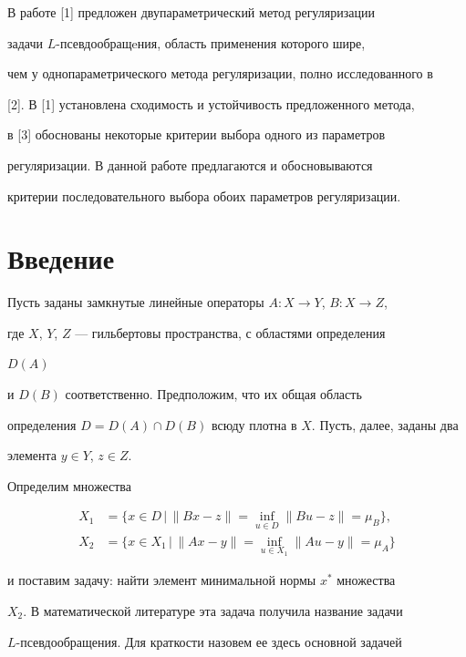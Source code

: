  


В работе [1] предложен двупараметрический метод регуляризации  


задачи $L$-псев\-до\-об\-ра\-щe\-ния, область применения которого шире, 


чем у однопараметрического метода регуляризации, полно исследованного в 


[2]. В [1] установлена сходимость и устойчивость предложенного метода, 


в [3] обоснованы некоторые критерии выбора одного из параметров  


регуляризации. В данной работе предлагаются и обосновываются  


критерии последовательного выбора обоих параметров регуляризации. 


 


\section{Введение} 


 


Пусть заданы замкнутые линейные операторы $A:X\to Y$, $B:X\to Z$, 


где $X$, $Y$, $Z$ --- гильбертовы пространства, с областями определения 


$D(A)$ 


и $D(B)$ соответственно. Предположим, что их общая область  


определения $D=D(A)\cap D(B)$ всюду плотна в $X$. Пусть, далее, заданы два  


элемента $y\in Y$, $z\in Z$. 


 


Определим множества 


\begin{align*} 


X_1&=\{x\in D\,\big|\,\|B x-z\|=\inf_{u\in D}\|B u-z\|=\mu_B\},\\ 


X_2&=\{x\in X_1\,\big|\,\|Ax-y\|=\inf_{u\in X_1}\|A u-y\|=\mu_A\} 


\end{align*} 


и поставим задачу: найти элемент минимальной нормы $x^*$ множества 


$X_2$. В математической литературе эта задача получила название задачи  


$L$-псевдообращения. Для краткости назовем ее здесь основной задачей  



